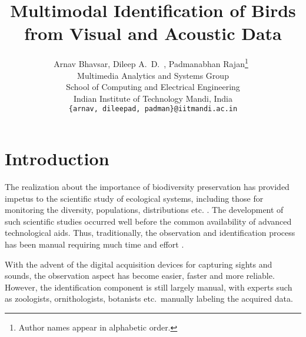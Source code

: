 \documentclass{article}
\begin{document}
\title{Multimodal Identification of Birds from Visual and Acoustic Data}
\author{Arnav Bhavsar, Dileep A.~D.~, Padmanabhan Rajan\footnote{Author names
appear in alphabetic order.}\  \\Multimedia Analytics and Systems Group \\ 
School of Computing and Electrical Engineering\\
Indian Institute of Technology Mandi, India\\
\texttt{\{arnav, dileepad, padman\}@iitmandi.ac.in}}

\date{}
\maketitle

\section{Introduction}






The realization about the importance of biodiversity preservation has provided
impetus to the scientific study of ecological systems, including those for
monitoring the diversity, populations, distributions etc.
\cite{monitor1,monitor2,monitor3,monitor4}. 
The development of such scientific studies occurred well before the common
availability of advanced technological aids. Thus, traditionally, the
observation and identification process has been manual requiring much time and
effort \cite{monitor4,human1,human2}. 

With the advent of the digital acquisition devices for capturing sights and
sounds, the observation aspect has become easier, faster and more reliable.
However, the identification component is still largely manual, with experts such
as zoologists, ornithologists, botanists etc.~manually labeling the acquired data. 
\end{document}
